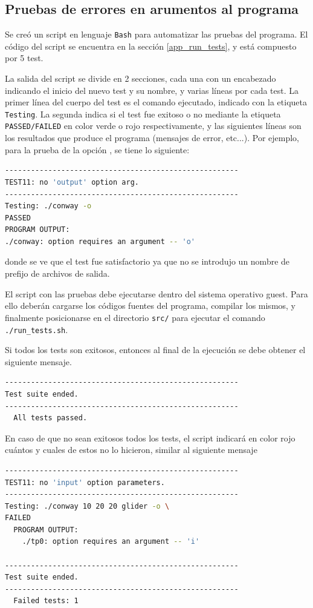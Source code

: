 \subsection{Pruebas de errores en arumentos al programa}

Se creó un script en lenguaje \texttt{Bash} para automatizar las pruebas del programa.  El código del script se encuentra en la sección \ref{app_run_tests}, y está compuesto por 5 test.

La salida del script se divide en 2 secciones, cada una con un encabezado indicando el inicio del nuevo test y su nombre, y varias líneas por cada test. La primer línea del cuerpo del test es el comando ejecutado, indicado con la etiqueta \texttt{Testing}. La segunda indica si el test fue exitoso o no mediante la etiqueta \texttt{PASSED/FAILED} en color verde o rojo respectivamente, y las siguientes líneas son los resultados que produce el programa (mensajes de error, etc...). Por ejemplo, para la prueba de la opción , se tiene lo siguiente:
\begin{lstlisting}[language=bash, style=StyleC]
------------------------------------------------------
TEST11: no 'output' option arg.
------------------------------------------------------
Testing: ./conway -o
PASSED
PROGRAM OUTPUT:
./conway: option requires an argument -- 'o'
\end{lstlisting}
donde se ve que el test fue satisfactorio ya que no se introdujo un nombre de prefijo de archivos de salida.

El script con las pruebas debe ejecutarse dentro del sistema operativo guest. Para ello deberán cargarse los códigos fuentes del programa, compilar los mismos, y finalmente posicionarse en el directorio \texttt{src/} para ejecutar el comando \texttt{./run\_tests.sh}.

Si todos los tests son exitosos, entonces al final de la ejecución se debe obtener el siguiente mensaje.
\begin{lstlisting}[language=bash, style=StyleC]
------------------------------------------------------
Test suite ended.
------------------------------------------------------
  All tests passed.
\end{lstlisting}

En caso de que no sean exitosos todos los tests, el script indicará en color rojo cuántos y cuales de estos no lo hicieron, similar al siguiente mensaje
\begin{lstlisting}[language=bash, style=StyleC]
------------------------------------------------------
TEST11: no 'input' option parameters.
------------------------------------------------------
Testing: ./conway 10 20 20 glider -o \
FAILED 
  PROGRAM OUTPUT:
	./tp0: option requires an argument -- 'i'

------------------------------------------------------
Test suite ended.
------------------------------------------------------
  Failed tests: 1
\end{lstlisting}


